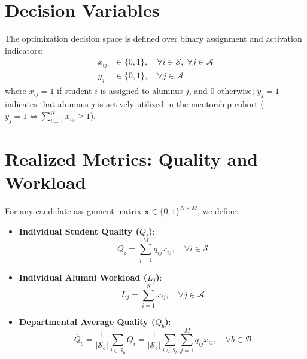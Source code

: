 \section{Decision Variables}
The optimization decision space is defined over binary assignment and activation indicators:
\begin{align}
    x_{ij} &\in \{0, 1\}, \quad \forall i \in \mathcal{S}, \; \forall j \in \mathcal{A} \label{eq:var_x} \\
    y_j &\in \{0, 1\}, \quad \forall j \in \mathcal{A} \label{eq:var_y}
\end{align}
where $x_{ij} = 1$ if student $i$ is assigned to alumnus $j$, and 0 otherwise; $y_j = 1$ indicates that alumnus $j$ is actively utilized in the mentorship cohort ($y_j = 1 \iff \sum_{i=1}^N x_{ij} \ge 1$).

\section{Realized Metrics: Quality and Workload}
For any candidate assignment matrix $\mathbf{x} \in \{0, 1\}^{N \times M}$, we define:
\begin{itemize}
    \item \textbf{Individual Student Quality ($Q_i$)}:
    \begin{equation}
        Q_i = \sum_{j=1}^M q_{ij} x_{ij}, \quad \forall i \in \mathcal{S}
        \label{eq:student_q}
    \end{equation}
    \item \textbf{Individual Alumni Workload ($L_j$)}:
    \begin{equation}
        L_j = \sum_{i=1}^N x_{ij}, \quad \forall j \in \mathcal{A}
        \label{eq:alumni_load}
    \end{equation}
    \item \textbf{Departmental Average Quality ($\overline{Q}_b$)}:
    \begin{equation}
        \overline{Q}_b = \frac{1}{|\mathcal{S}_b|} \sum_{i \in \mathcal{S}_b} Q_i = \frac{1}{|\mathcal{S}_b|} \sum_{i \in \mathcal{S}_b} \sum_{j=1}^M q_{ij} x_{ij}, \quad \forall b \in \mathcal{B}
        \label{eq:branch_avg_q}
    \end{equation}
\end{itemize}


